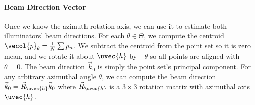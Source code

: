 \paragraph{Beam Direction Vector}
Once we know the azimuth rotation axis, we can use it to estimate both illuminators' beam directions. For each $\theta \in \Theta$, we compute the centroid $\vecol{p}_\theta = \frac{1}{N} \sum p_n$. We subtract the centroid from the point set so it is zero mean, and we rotate it about $\uvec{h}$ by $-\theta$ so all points are aligned with $\theta = 0$. The beam direction $\vec{k}_0$ is simply the point set's principal component. For any arbitrary azimuthal angle $\theta$, we can compute the beam direction $\vec{k}_0 = \vec{R}_{\uvec{h}} \vec{k}_0$ where $\vec{R}_{\uvec{h}}$ is a $3 \times 3$ rotation matrix with azimuthal axis $\uvec{h}$.

